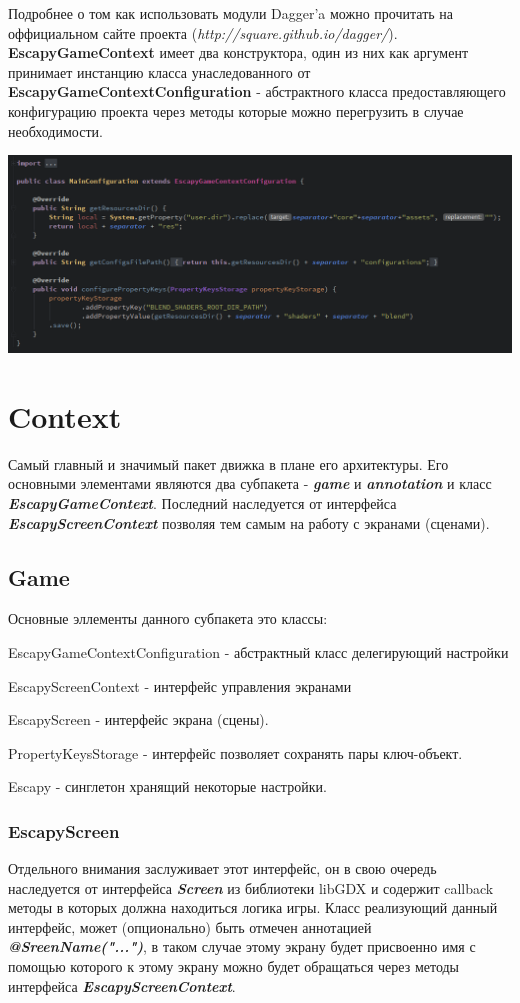 \documentclass[11pt]{report}
\newenvironment{itemize*}%
  {\begin{itemize}%
    \setlength{\itemsep}{2pt}%
    \setlength{\parskip}{0.75pt}}%
  {\end{itemize}}
\begin{document}
Подробнее о том как использовать модули Dagger'a можно прочитать на оффициальном  сайте проекта (\textit{http://square.github.io/dagger/}). \textbf{EscapyGameContext} имеет два конструктора, один из них как аргумент принимает инстанцию класса унаследованного от
\textbf{EscapyGameContextConfiguration} - абстрактного класса предоставляющего конфигурацию проекта через методы которые можно перегрузить в случае необходимости.
\begin{center}
	\includegraphics[width=1.2\linewidth]{img/4.png} 
  	\label{img:4} 
\end{center}


\chapter{Context}
Самый главный и значимый пакет движка в плане его архитектуры. Его основными элементами
являются два субпакета - \textit{\textbf{game}} и \textit{\textbf{annotation}} и класс
\textit{\textbf{EscapyGameContext}}. Последний наследуется от интерфейса \textit{\textbf{EscapyScreenContext}} позволяя тем самым на работу с экранами (сценами).

\section{Game}
Основные эллементы данного субпакета это классы: \begin{itemize*}
\item EscapyGameContextConfiguration - абстрактный класс делегирующий настройки
\item EscapyScreenContext - интерфейс управления экранами
\item EscapyScreen - интерфейс экрана (сцены).
\item PropertyKeysStorage - интерфейс позволяет сохранять пары ключ-объект.
\item Escapy - синглетон хранящий некоторые настройки.
\end{itemize*}
\subsection*{EscapyScreen}
Отдельного внимания заслуживает этот интерфейс, он в свою очередь наследуется от интерфейса \textit{\textbf{Screen}} из библиотеки libGDX и содержит callback методы в которых должна находиться логика игры. Класс реализующий данный интерфейс, может (опционально) быть отмечен аннотацией \textit{\textbf{@SreenName("...")}}, в таком случае этому экрану будет присвоенно имя с помощью которого к этому экрану можно будет обращаться через методы интерфейса \textit{\textbf{EscapyScreenContext}}.
\end{document}
